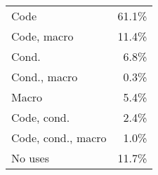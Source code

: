 \begin{tabular}{|lr|}\hline
Code & 61.1\% \\
Code, macro & 11.4\% \\
Cond. & \phantom{0}6.8\% \\
Cond., macro & \phantom{0}0.3\% \\
Macro & \phantom{0}5.4\% \\
Code, cond. & \phantom{0}2.4\% \\
Code, cond., macro & \phantom{0}1.0\% \\
No uses & 11.7\% \\ \hline
\end{tabular}

